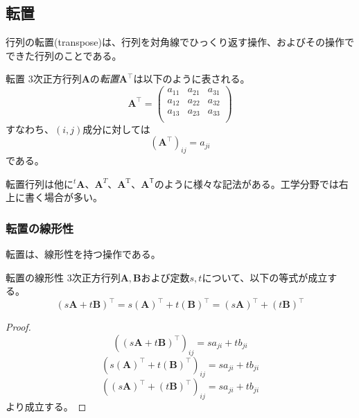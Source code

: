 \subsection{転置}
行列の転置(transpose)は、行列を対角線でひっくり返す操作、およびその操作でできた行列のことである。
\begin{definition*}{転置}
	3次正方行列\(\boldsymbol{A}\)の\emph{転置}\(\boldsymbol{A}^{\top}\)は以下のように表される。
	\begin{equation}
		\boldsymbol{A}^{\top}=
		\begin{pmatrix}
			a_{11} & a_{21} & a_{31} \\
			a_{12} & a_{22} & a_{32} \\
			a_{13} & a_{23} & a_{33} \\
		\end{pmatrix}
	\end{equation}
	すなわち、\((i,j)\)成分に対しては
	\begin{equation}
		(\boldsymbol{A}^{\top})_{ij}=a_{ji}
	\end{equation}
	である。
\end{definition*}
転置行列は他に\(^t\!\boldsymbol{A}\)、\(\boldsymbol{A}^T\)、\(\boldsymbol{A}^\mathrm{T}\)、\(\boldsymbol{A}^\mathsf{T}\)のように様々な記法がある。工学分野では右上に書く場合が多い。
\subsubsection{転置の線形性}
転置は、線形性を持つ操作である。
\begin{theorem*}{転置の線形性}
	3次正方行列\(\boldsymbol{A},\boldsymbol{B}\)および定数\(s,t\)について、以下の等式が成立する。
	\begin{equation}
		(s\boldsymbol{A}+t\boldsymbol{B})^{\top}=s(\boldsymbol{A})^{\top}+t(\boldsymbol{B})^{\top}=(s\boldsymbol{A})^{\top}+(t\boldsymbol{B})^{\top}
	\end{equation}
\end{theorem*}
\begin{proof}
	\begin{equation}
		\left((s\boldsymbol{A}+t\boldsymbol{B})^{\top}\right)_{ij}= sa_{ji}+tb_{ji}
	\end{equation}
	\begin{equation}
		\left(s(\boldsymbol{A})^{\top}+t(\boldsymbol{B})^{\top}\right)_{ij}= sa_{ji}+tb_{ji}
	\end{equation}
	\begin{equation}
		\left((s\boldsymbol{A})^{\top}+(t\boldsymbol{B})^{\top}\right)_{ij}= sa_{ji}+tb_{ji}
	\end{equation}
	より成立する。
\end{proof}

